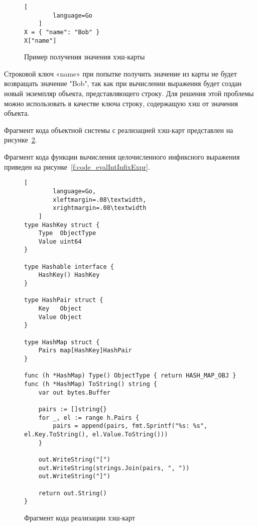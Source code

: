 \begin{figure}[!htb]
	\centering
    \vspace{\toppaddingoffigure}
	\begin{lstlisting}[
        language=Go
    ]
X = { "name": "Bob" }
X["name"]     
\end{lstlisting}
	\caption{Пример получения значения хэш-карты}
	\label{f:code_hashmapGetValueExample}
\end{figure}

Строковой ключ «name» при попытке получить значение из карты не будет возвращать значение "Bob",
так как при вычислении выражения будет создан новый экземпляр объекта, представляющего строку.
Для решения этой проблемы можно использовать в качестве ключа строку, содержащую хэш от значения объекта.

Фрагмент кода объектной системы с реализацией хэш-карт представлен на рисунке~\ref{f:code_hashmapObject}.

Фрагмент кода функции вычисления целочисленного инфиксного выражения приведен на рисунке~\ref{f:code_evalIntInfixExpr}.

\clearpage

\begin{figure}[!htb]
	\centering
	\begin{lstlisting}[
        language=Go,
        xleftmargin=.08\textwidth,
        xrightmargin=.08\textwidth
    ]
type HashKey struct {
    Type  ObjectType
    Value uint64
}

type Hashable interface {
    HashKey() HashKey
}

type HashPair struct {
    Key   Object
    Value Object
}

type HashMap struct {
    Pairs map[HashKey]HashPair
}

func (h *HashMap) Type() ObjectType { return HASH_MAP_OBJ }
func (h *HashMap) ToString() string {
    var out bytes.Buffer

    pairs := []string{}
    for _, el := range h.Pairs {
        pairs = append(pairs, fmt.Sprintf("%s: %s", el.Key.ToString(), el.Value.ToString()))
    }

    out.WriteString("[")
    out.WriteString(strings.Join(pairs, ", "))
    out.WriteString("]")

    return out.String()
} 
\end{lstlisting}
	\caption{Фрагмент кода реализации хэш-карт}
	\label{f:code_hashmapObject}
\end{figure}

\clearpage

